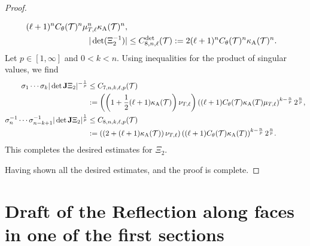 \documentclass[10pt,a4paper]{article}
\begin{document}
\begin{proof}
\begin{itemize}
\begin{align*}
            (\ell+1)^{n}
            C_\theta({\mathcal T})^{n}
            \mu_{T,\ell}^{n}
            \kappa_{\rm A}({\mathcal T})^{n}
            ,
            \\
            |\det(\Xi_{2}^{-1})|
            &\leq 
            C^{\det}_{8,n,\ell}({\mathcal T})
            :=
            2
            (\ell+1)^{n}
            C_\theta({\mathcal T})^{n}
            \kappa_{\rm A}({\mathcal T})^{n}
            .
        \end{align*}
        \color{blue}
        Let $p \in [1,\infty]$ and $0 < k < n$. Using inequalities for the product of singular values, we find 
        \begin{align*}
            \sigma_{1}\cdots\sigma_{k} | \det{\mathbf{J}}\Xi_{2} |^{-\frac 1 p}
            &
            \leq 
            C_{7,n,k,\ell,p}({\mathcal T})
            \\&
            :=
            \left( 
            \left( 1 + \frac 1 2 ( \ell+1 )\kappa_{\rm A}({\mathcal T}) \right)
            \nu_{T,\ell}
            \right)
            \left( (\ell+1) C_\theta({\mathcal T}) \kappa_{\rm A}(T)\mu_{T,\ell} \right)^{k-\frac n p} 2^{\frac n p}
            ,
            \\
            \sigma_{n}^{-1}\cdots\sigma_{n-k+1}^{-1} | \det{\mathbf{J}}\Xi_{2} |^{\frac 1 p}
            &
            \leq 
            C_{8,n,k,\ell,p}({\mathcal T})
            \\&
            :=
            \left(
            \left( 2 + ( \ell+1 )\kappa_{\rm A}({\mathcal T}) \right)
            \nu_{T,\ell}
            \right)
            \left( (\ell+1) C_\theta({\mathcal T}) \kappa_{\rm A}(T) \right)^{k-\frac n p} 2^{\frac n p}            
            .
        \end{align*}
        \color{black}
        This completes the desired estimates for $\Xi_{2}$. 
    \end{itemize}
    Having shown all the desired estimates, and the proof is complete. 
\end{proof}
        

        
        
    
    
\section{Draft of the Reflection along faces in one of the first sections}
\end{document}
